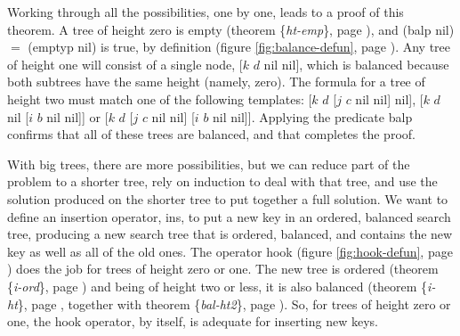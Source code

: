 Working through all the possibilities, one by one,
leads to a proof of this theorem.
A tree of height zero is empty
(theorem \{\emph{ht-emp}\}, page \pageref{thm:ht-emp}),
and \textsf{(balp nil)} $=$ \textsf{(emptyp nil)} is true, by definition
(figure \ref{fig:balance-defun}, page \pageref{fig:balance-defun}).
Any tree of height one will consist of a single node,
\textsf{[$k$ $d$ nil nil]}, which is balanced because both subtrees
have the same height (namely, zero).
The formula for a tree of height two must match one of the following templates:
\textsf{[$k$ $d$ [$j$ $c$ nil nil] nil]}, \textsf{[$k$ $d$ nil [$i$ $b$ nil nil]]}
or \textsf{[$k$ $d$ [$j$ $c$ nil nil] [$i$ $b$ nil nil]]}.
Applying the predicate \textsf{balp}
confirms that all of these trees are balanced,
and that completes the proof.

With big trees, there are more possibilities,
but we can reduce part of the problem to
a shorter tree, rely on induction to deal with that tree,
and use the solution produced on the shorter tree
to put together a full solution.
We want to define an insertion operator, \textsf{ins},
to put a new key in
an ordered, balanced search tree,
producing a new search tree that is ordered, balanced,
and contains the new key as well as all of the old ones.
The operator \textsf{hook} (figure \ref{fig:hook-defun}, page \pageref{fig:hook-defun})
does the job for trees of height zero or one.
The new tree is ordered (theorem \{\emph{i-ord}\}, page \pageref{thm:i-ord})
and being of height two or less, it is also balanced
(theorem \{\emph{i-ht}\}, page \pageref{thm:i-ht},
together with theorem \{\emph{bal-ht2}\}, page \pageref{thm:bal-ht2}).
So, for trees of height zero or one,
the \textsf{hook} operator, by itself, is adequate for
inserting new keys.

